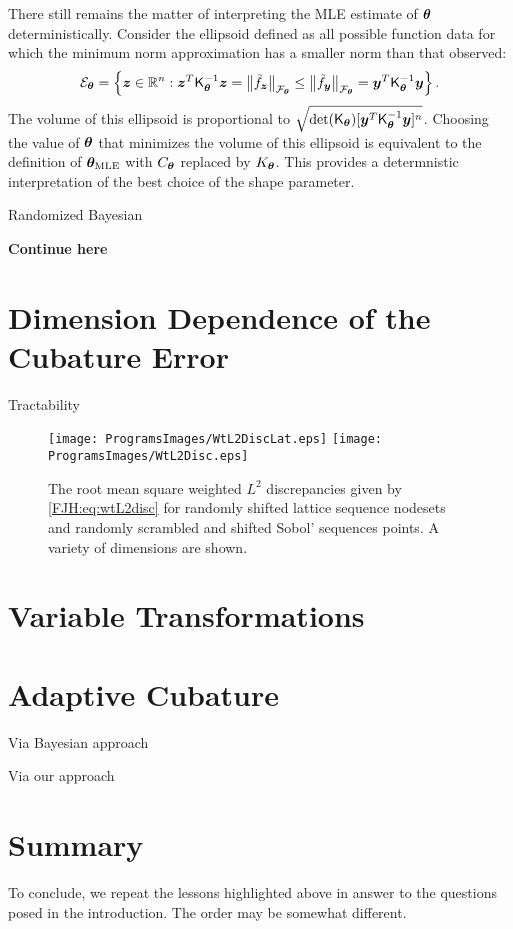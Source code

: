 \documentclass[graybox,footinfo]{svmult}
\begin{document}
There still remains the matter of interpreting the MLE estimate of ${\boldsymbol{\theta}}$ 
deterministically.  Consider the ellipsoid defined as all possible function data for 
which the minimum norm approximation has a smaller norm than that observed:
\[
{\mathcal{E}}_{\boldsymbol{\theta}} = \left\{ {\boldsymbol{z}} \in {\mathbb{R}}^n :  {\boldsymbol{z}}^T 
\mathsf{K}_{\boldsymbol{\theta}}^{-1} {\boldsymbol{z}} = \left \lVert \tilde{f}_{\boldsymbol{z}} \right \rVert_{{\mathcal{F}}_{\boldsymbol{\theta}}} \le 
\left \lVert \tilde{f}_{\boldsymbol{y}} \right \rVert_{{\mathcal{F}}_{\boldsymbol{\theta}}} =  {\boldsymbol{y}}^T 
\mathsf{K}_{\boldsymbol{\theta}}^{-1} {\boldsymbol{y}} \right\}.
\]
The volume of this ellipsoid is proportional to $\sqrt{\det(\mathsf{K}_{\boldsymbol{\theta}}) [ {\boldsymbol{y}}^T 
	\mathsf{K}_{\boldsymbol{\theta}}^{-1} {\boldsymbol{y}}]^n}$.  Choosing the value of ${\boldsymbol{\theta}}$ that minimizes 
	the volume of this ellipsoid is equivalent to the definition of ${\boldsymbol{\theta}}_{\text{MLE}}$ with 
	$C_{\boldsymbol{\theta}}$ replaced by $K_{\boldsymbol{\theta}}$.  This provides a determnistic interpretation of 
	the best choice of the shape parameter.


Randomized Bayesian



\textbf{Continue here}


\section{Dimension Dependence of the Cubature Error}

Tractability



\begin{figure}
	\centering
	\texttt{[image: ProgramsImages/WtL2DiscLat.eps]}   \qquad 
	\texttt{[image: ProgramsImages/WtL2Disc.eps]} 
	\caption{The root mean square weighted $L^2$ discrepancies given by 
	\eqref{FJH:eq:wtL2disc} 
		for randomly shifted 
		lattice sequence nodesets and randomly scrambled and shifted Sobol' sequences 
		points.  A variety of dimensions are shown.
		\label{FJH:fig:wtdiscdiffpts}}
\end{figure}

\section{Variable Transformations}

\section{Adaptive Cubature}
Via Bayesian approach

Via our approach


\section{Summary}
To conclude, we repeat the lessons highlighted above in answer to the questions posed 
in the 
introduction.  The order may be somewhat different.
\end{document}
